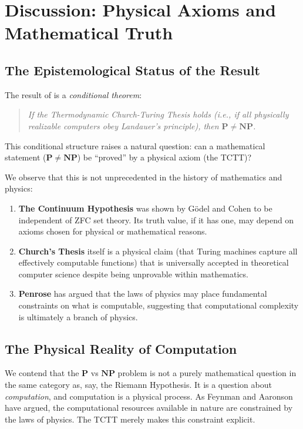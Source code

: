 \documentclass[12pt, a4paper]{article}
\newcommand{\Pc}{\mathbf{P}}
\newcommand{\NPc}{\mathbf{NP}}
\theoremstyle{plain}
\theoremstyle{definition}
\theoremstyle{remark}
\begin{document}
\section{Discussion: Physical Axioms and Mathematical Truth}\label{sec:discussion}

\subsection{The Epistemological Status of the Result}

The result of  is a \emph{conditional theorem}:
\begin{quote}
  \emph{If the Thermodynamic Church-Turing Thesis holds (i.e., if all
  physically realizable computers obey Landauer's principle), then
  $\Pc \neq \NPc$.}
\end{quote}

This conditional structure raises a natural question: can a mathematical
statement ($\Pc \neq \NPc$) be ``proved'' by a physical axiom (the TCTT)?

We observe that this is not unprecedented in the history of mathematics
and physics:
\begin{enumerate}[label=(\alph*)]
  \item \textbf{The Continuum Hypothesis} was shown by G\"odel and Cohen to
    be independent of ZFC set theory. Its truth value, if it has one, may
    depend on axioms chosen for physical or mathematical reasons.
  \item \textbf{Church's Thesis} itself is a physical claim
    (that Turing machines capture all effectively computable functions)
    that is universally accepted in theoretical computer science despite
    being unprovable within mathematics.
  \item \textbf{Penrose} \citep{Penrose1989, Penrose2004} has argued that
    the laws of physics may place fundamental constraints on what
    is computable, suggesting that computational complexity is
    ultimately a branch of physics.
\end{enumerate}

\subsection{The Physical Reality of Computation}

We contend that the $\Pc$ vs $\NPc$ problem is not a purely mathematical
question in the same category as, say, the Riemann Hypothesis. It is a
question about \emph{computation}, and computation is a physical process.
As Feynman \citep{Feynman1982} and Aaronson \citep{Aaronson2005} have
argued, the computational resources available in nature are constrained
by the laws of physics. The TCTT merely makes this constraint explicit.
\end{document}
